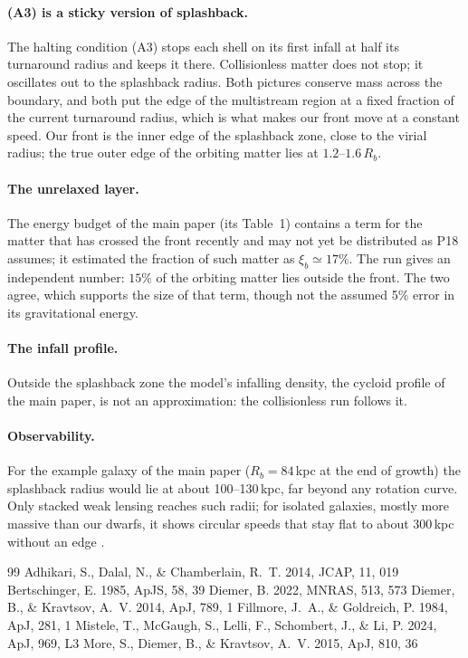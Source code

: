 \documentclass[11pt,a4paper]{article}
\newcommand{\Rb}{R_b}
\begin{document}
\paragraph{(A3) is a sticky version of splashback.} The halting condition
(A3) stops each shell on its first infall at half its turnaround radius
and keeps it there. Collisionless matter does not stop; it oscillates
out to the splashback radius. Both pictures conserve mass across the
boundary, and both put the edge of the multistream region at a fixed
fraction of the current turnaround radius, which is what makes our front
move at a constant speed. Our front is the inner edge of the splashback
zone, close to the virial radius; the true outer edge of the orbiting
matter lies at $1.2$--$1.6\,\Rb$.

\paragraph{The unrelaxed layer.} The energy budget of the main paper
(its Table~1) contains a term for the matter that has crossed the front
recently and may not yet be distributed as P18 assumes; it estimated
the fraction of such matter as $\xi_b\simeq17\%$. The run gives an
independent number: $15\%$ of the orbiting matter lies outside the front.
The two agree, which supports the size of that term, though not the
assumed 5\% error in its gravitational energy.

\paragraph{The infall profile.} Outside the splashback zone the model's
infalling density, the cycloid profile of the main paper, is not an
approximation: the collisionless run follows it.

\paragraph{Observability.} For the example galaxy of the main paper
($\Rb=84$\,kpc at the end of growth) the splashback radius would lie at
about 100--130\,kpc, far beyond any rotation curve. Only stacked weak
lensing reaches such radii; for isolated galaxies, mostly more massive
than our dwarfs, it shows circular speeds that stay flat to about
300\,kpc without an edge \citep{Mistele2024}.

\begin{thebibliography}{99}
 Adhikari, S., Dalal, N., \& Chamberlain, R.~T. 2014, JCAP, 11, 019
 Bertschinger, E. 1985, ApJS, 58, 39
 Diemer, B. 2022, MNRAS, 513, 573
 Diemer, B., \& Kravtsov, A.~V. 2014, ApJ, 789, 1
 Fillmore, J.~A., \& Goldreich, P. 1984, ApJ, 281, 1
 Mistele, T., McGaugh, S., Lelli, F., Schombert, J., \& Li, P. 2024, ApJ, 969, L3
 More, S., Diemer, B., \& Kravtsov, A.~V. 2015, ApJ, 810, 36
\end{thebibliography}
\end{document}
